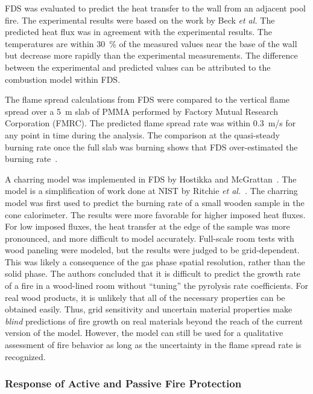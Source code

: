 FDS was  evaluated to predict  the heat transfer  to the wall  from an adjacent pool fire.   The experimental results were based  on the work by Beck
{\em et al.}  The  predicted heat flux was  in agreement with the experimental  results.  The temperatures  are within 30~\%  of the measured values
near the base of  the wall but  decrease more rapidly than  the  experimental  measurements.   The  difference  between  the experimental and
predicted values  can be attributed to the combustion model within FDS.

The flame spread  calculations from FDS were compared  to the vertical flame  spread over  a 5~m  slab of  PMMA performed  by  Factory Mutual
Research  Corporation (FMRC).   The  predicted flame  spread rate  was within  0.3~m/s  for any  point  in  time  during the  analysis.   The
comparison at  the quasi-steady  burning rate once  the full  slab was burning     shows    that     FDS    over-estimated     the    burning
rate~\cite{Ma:2,Ma:3}.

A   charring  model   was   implemented  in   FDS   by  Hostikka   and McGrattan~\cite{Hostikka:2}.  The model  is a  simplification  of work done at
NIST by Ritchie  {\em et al.}~\cite{Ritchie:1}.  The charring model was  first used to  predict the burning  rate of a  small wooden sample in the
cone calorimeter.  The results were  more favorable for higher imposed heat fluxes. For  low imposed fluxes, the heat transfer at the edge  of the
sample was more pronounced,  and more difficult to model  accurately.   Full-scale room  tests  with  wood paneling  were modeled, but  the results
were  judged to be grid-dependent.  This was likely a consequence of the  gas phase spatial resolution, rather than the solid phase. The authors
concluded that it is difficult to predict the growth rate of a fire  in a wood-lined room without ``tuning'' the pyrolysis rate  coefficients. For
real  wood products, it  is unlikely that all  of the  necessary properties can  be obtained  easily. Thus, grid sensitivity  and uncertain  material
properties make  {\em blind} predictions of fire  growth on real materials beyond  the reach of the current version of the model. However, the model
can still be used for a qualitative assessment  of fire behavior as long  as the uncertainty in the flame spread rate is recognized.


\subsubsection{Response of Active and Passive Fire Protection}

